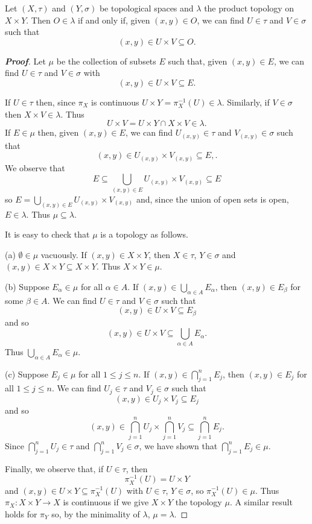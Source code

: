 \begin{lemma}\label{L;product topology} 
Let $(X,\tau)$ and $(Y,\sigma)$
be topological spaces and $\lambda$ the product topology
on $X\times Y$.
Then $O\in\lambda$ if and only if, given $(x,y)\in O$,
we can find $U\in \tau$ and $V\in \sigma$ such that
\[(x,y)\in U\times V\subseteq O.\]
\end{lemma}
\begin{proof}[\bf Proof] Let $\mu$ be the collection of subsets
$E$ such that, given $(x,y)\in E$,
we can find $U\in \tau$ and $V\in \sigma$ with
\[(x,y)\in U\times V\subseteq E.\]

If $U\in \tau$ then, since $\pi_{X}$ is continuous
$U\times Y=\pi_{X}^{-1}(U)\in\lambda$. Similarly,
if $V\in\sigma$ then $X\times V\in\lambda$. Thus
\[U\times V=U\times Y\cap X\times V\in\lambda.\]
If $E\in\mu$ then, given $(x,y)\in E$, we can find
$U_{(x,y)}\in \tau$ and $V_{(x,y)}\in \sigma$ such that
\[(x,y)\in U_{(x,y)}\times V_{(x,y)}\subseteq E,.\]
We observe that
\[E\subseteq \bigcup_{(x,y)\in E}U_{(x,y)}\times V_{(x,y)}\subseteq E\]
so $E=\bigcup_{(x,y)\in E}U_{(x,y)}\times V_{(x,y)}$ and, since the
union of open sets is open, $E\in\lambda$. Thus $\mu\subseteq\lambda$.

It is easy to check that $\mu$ is a topology as follows.

(a) $\emptyset\in\mu$ vacuously. If $(x,y)\in X\times Y$,
then $X\in\tau$, $Y\in\sigma$ and 
$(x,y)\in X\times Y\subseteq X\times Y$. Thus $X\times Y\in\mu$.

(b) Suppose $E_{\alpha}\in\mu$ for all $\alpha\in A$.
If $(x,y)\in\bigcup_{\alpha\in A}E_{\alpha}$,
then $(x,y)\in E_{\beta}$ for some $\beta\in A$.
We can find $U\in \tau$ and $V\in \sigma$ such that
\[(x,y)\in U\times V\subseteq E_{\beta}\] 
and so
\[(x,y)\in U\times V\subseteq\bigcup_{\alpha\in A}E_{\alpha}.\]
Thus $\bigcup_{\alpha\in A}E_{\alpha}\in\mu$.

(c) Suppose $E_{j}\in\mu$ for all $1\leq j\leq n$.
If $(x,y)\in\bigcap_{j=1}^{n}E_{j}$,
then $(x,y)\in E_{j}$ for all $1\leq j\leq n$.
We can find $U_{j}\in \tau$ and $V_{j}\in \sigma$ such that
\[(x,y)\in U_{j}\times V_{j}\subseteq E_{j}\] 
and so
\[(x,y)\in \bigcap_{j=1}^{n} U_{j}\times \bigcap_{j=1}^{n} V_{j}
\subseteq\bigcap_{j=1}^{n}E_{j}.\]
Since $\bigcap_{j=1}^{n} U_{j}\in\tau$ 
and $\bigcap_{j=1}^{n} V_{j}\in\sigma$,
we have shown that $\bigcap_{j=1}^{n}E_{j}\in\mu$.

Finally, we observe that, if $U\in\tau$, then 
\[\pi_{X}^{-1}(U)=U\times Y\]
and $(x,y)\in U\times Y\subseteq \pi_{X}^{-1}(U)$ 
with $U\in\tau$, $Y\in\sigma$,
so $\pi_{X}^{-1}(U)\in\mu$. Thus $\pi_{X}:X\times Y\rightarrow X$
is continuous if we give $X\times Y$ the topology $\mu$. A similar
result holds for $\pi_{Y}$ so, by the minimality of $\lambda$, 
$\mu=\lambda$.
\end{proof}

